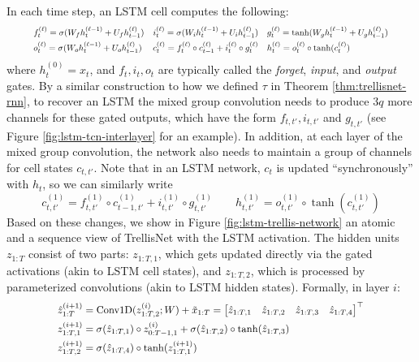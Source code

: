 \documentclass{article} \usepackage{iclr2019_conference,times}
\begin{document}
In each time step, an LSTM cell computes the following:
\begin{equation}
\label{eq:full-kernel-rewrite}
\resizebox{.92\hsize}{!}{
$
\begin{aligned}
&f_t^{(\ell)} = \sigma(W_f h_t^{(\ell-1)} + U_f h_{t-1}^{(\ell)}) &i_t^{(\ell)} = \sigma(W_i h_t^{(\ell-1)} + U_i h_{t-1}^{(\ell)}) \quad &g_t^{(\ell)} = \tanh(W_g h_t^{(\ell-1)} + U_g h_{t-1}^{(\ell)})\\
&o_t^{(\ell)} = \sigma(W_o h_t^{(\ell-1)} + U_o h_{t-1}^{(\ell)}) &c_t^{(\ell)} = f_t^{(\ell)} \circ c_{t-1}^{(\ell)} + i_t^{(\ell)} \circ g_t^{(\ell)} \quad &h_t^{(\ell)} = o_t^{(\ell)} \circ \tanh(c_t^{(\ell)})
\end{aligned}
$
}
\end{equation}
where $h_t^{(0)}=x_t$, and $f_t, i_t, o_t$ are typically called the \emph{forget}, \emph{input}, and \emph{output} gates. By a similar construction to how we defined $\tau$ in Theorem \ref{thm:trellisnet-rnn}, to recover an LSTM the mixed group convolution needs to produce $3q$ more channels for these gated outputs, which have the form $f_{t,t'}, i_{t,t'}$ and $g_{t,t'}$ (see Figure \ref{fig:lstm-tcn-interlayer} for an example). In addition, at each layer of the mixed group convolution, the network also needs to maintain a group of channels for cell states $c_{t,t'}$. Note that in an LSTM network, $c_t$ is updated ``synchronously'' with $h_t$, so we can similarly write
\begin{equation}
\label{eq:lstm-gated-activation}
c_{t,t'}^{(1)} = f_{t,t'}^{(1)} \circ c_{t-1,t'}^{(1)} + i_{t,t'}^{(1)} \circ g_{t,t'}^{(1)} \qquad h_{t,t'}^{(1)} = o_{t,t'}^{(1)} \circ \tanh(c_{t,t'}^{(1)})
\end{equation}
Based on these changes, we show in Figure \ref{fig:lstm-trellis-network} an atomic and a sequence view of TrellisNet with the LSTM activation. The hidden units $z_{1:T}$ consist of two parts: $z_{1:T,1}$, which gets updated directly via the gated activations (akin to LSTM cell states), and $z_{1:T,2}$, which is processed by parameterized convolutions (akin to LSTM hidden states). Formally, in layer $i$:
\begin{equation*}
\resizebox{0.8\hsize}{!}{
$
\begin{aligned}
\hat{z}_{1:T}^{(i+1)} &= \text{Conv1D}(z_{1:T,2}^{(i)}; W) + \tilde{x}_{1:T} = \begin{bmatrix}\hat{z}_{1:T,1} & \hat{z}_{1:T,2} & \hat{z}_{1:T,3} & \hat{z}_{1:T,4} \end{bmatrix}^\top \\
z_{1:T, 1}^{(i+1)} &= \sigma(\hat{z}_{1:T,1}) \circ z_{0:T-1, 1}^{(i)} + \sigma(\hat{z}_{1:T, 2}) \circ \tanh(\hat{z}_{1:T, 3}) \\
z_{1:T, 2}^{(i+1)} &= \sigma(\hat{z}_{1:T,4}) \circ \tanh(z_{1:T, 1}^{(i+1)})
\end{aligned}
$
}
\end{equation*}
\vspace{-.1in}
\end{document}
